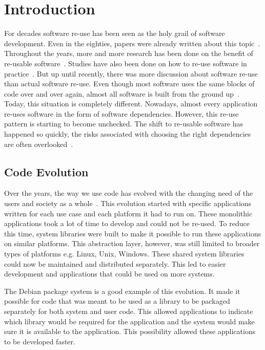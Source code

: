 \chapter{Introduction}

For decades software re-use has been seen as the holy grail of software development. Even in the eighties, papers were already written about this topic~\cite{standish1984essay}. Throughout the years, more and more research has been done on the benefit of re-usable software~\cite{jacobson1997software}. Studies have also been done on how to re-use software in practice~\cite{reifer1997practical}. But up until recently, there was more discussion about software re-use than actual software re-use. Even though most software uses the same blocks of code over and over again, almost all software is built from the ground up~\cite{frakes2005software}. Today, this situation is completely different. Nowadays, almost every application re-uses software in the form of software dependencies. However, this re-use pattern is starting to become unchecked. The shift to re-usable software has happened so quickly, the risks associated with choosing the right dependencies are often overlooked~\cite{cox2019surviving}. 

\section{Code Evolution}
Over the years, the way we use code has evolved with the changing need of the users and society as a whole~\cite{rajlich2014software}. This evolution started with specific applications written for each use case and each platform it had to run on. These monolithic applications took a lot of time to develop and could not be re-used. To reduce this time, system libraries were built to make it possible to run these applications on similar platforms. This abstraction layer, however, was still limited to broader types of platforms e.g. Linux, Unix, Windows. These shared system libraries could now be maintained and distributed separately. This led to easier development and applications that could be used on more systems.

The Debian package system is a good example of this evolution. It made it possible for code that was meant to be used as a library to be packaged separately for both system and user code. This allowed applications to indicate which library would be required for the application and the system would make sure it is available to the application. This possibility allowed these applications to be developed faster. ~\cite{zacchiroli2011debian}

